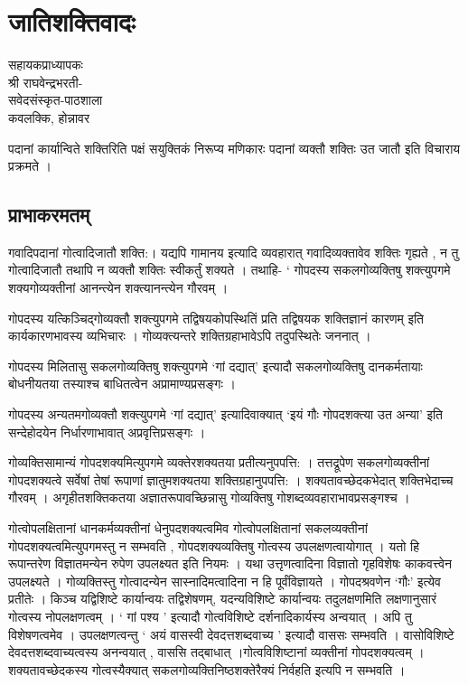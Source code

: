 {\fontsize{15}{17}\selectfont
\chapter{जातिशक्तिवादः}


\begin{center}
\smallskip

सहायकप्राध्यापकः\\
श्री राघवेन्द्रभरती-\\
सवेदसंस्कृत-पाठशाला\\
कवलक्कि, होन्नावर
\addrule
\end{center}

पदानां कार्यान्विते शक्तिरिति पक्षं सयुक्तिकं निरूप्य मणिकारः पदानां व्यक्तौ शक्तिः उत जातौ इति विचाराय प्रक्रमते ।

\section*{प्राभाकरमतम्}

गवादिपदानां गोत्वादिजातौ शक्ति:। यद्यपि गामानय इत्यादि व्यवहारात् गवादिव्यक्तावेव शक्तिः गृह्यते , न तु गोत्वादिजातौ तथापि न व्यक्तौ शक्तिः स्वीकर्तुं शक्यते । तथाहि- ‘ गोपदस्य सकलगोव्यक्तिषु शक्त्युपगमे शक्यगोव्यक्तीनां आनन्त्येन शक्त्यानन्त्येन गौरवम् ।

गोपदस्य यत्किञ्चिद्गोव्यक्तौ शक्त्युपगमे तद्विषयकोपस्थितिं प्रति तद्विषयक शक्तिज्ञानं कारणम् इति कार्यकारणभावस्य व्यभिचारः । गोव्यक्त्यन्तरे शक्तिग्रहाभावेऽपि तदुपस्थितेः जननात् ।

गोपदस्य मिलितासु सकलगोव्यक्तिषु शक्त्युपगमे ‘गां दद्यात्’ इत्यादौ सकलगोव्यक्तिषु दानकर्मतायाः बोधनीयतया तस्याश्च बाधितत्वेन अप्रामाण्यप्रसङ्गः ।

गोपदस्य अन्यतमगोव्यक्तौ शक्त्युपगमे ‘गां दद्यात्’ इत्यादिवाक्यात् ‘इयं गौः गोपदशक्त्या उत अन्या’ इति सन्देहोदयेन निर्धारणाभावात् अप्रवृत्तिप्रसङ्गः ।

गोव्यक्तिसामान्यं गोपदशक्यमित्युपगमे व्यक्तेरशक्यतया प्रतीत्यनुपपत्ति: । तत्तद्रूपेण सकलगोव्यक्तीनां गोपदशक्यत्वे सर्वेषां तेषां रूपाणां ज्ञातुमशक्यतया शक्तिग्रहानुपपत्ति: । शक्यतावच्छेदकभेदात् शक्तिभेदाच्च गौरवम् । अगृहीतशक्तिकतया अज्ञातरूपावच्छिन्नासु गोव्यक्तिषु गोशब्दव्यवहाराभावप्रसङ्गश्च ।

गोत्वोपलक्षितानां धानकर्मव्यक्तीनां धेनुपदशक्यत्वमिव गोत्वोपलक्षितानां सकलव्यक्तीनां गोपदशक्यत्वमित्युपगमस्तु न सम्भवति , गोपदशक्यव्यक्तिषु गोत्वस्य उपलक्षणत्वायोगात् । यतो हि रूपान्तरेण विज्ञातमन्येन रुपेण उपलक्ष्यत इति नियमः । यथा उत्तृणत्वादिना विज्ञातो गृहविशेषः काकवत्त्वेन उपलक्ष्यते । गोव्यक्तिस्तु गोत्वादन्येन सास्नादिमत्वादिना न हि पूर्वंविज्ञायते । गोपदश्रवणेन ‘गौः’ इत्येव प्रतीतेः । किञ्च यद्विशिष्टे कार्यान्वयः तद्विशेषणम्, यदन्यविशिष्टे कार्यान्वयः तदुलक्षणमिति लक्षणानुसारं गोत्वस्य नोपलक्षणत्वम् । ‘ गां पश्य ’ इत्यादौ गोत्वविशिष्टे दर्शनादिकार्यस्य अन्वयात् । अपि तु विशेषणत्वमेव । उपलक्षणत्वन्तु ‘ अयं वासस्वी देवदत्तशब्दवाच्य ’ इत्यादौ वाससः सम्भवति । वासोविशिष्टे देवदत्तशब्दवाच्यत्वस्य अनन्वयात् , वाससि तद्बाधात् ।गोत्वविशिष्टानां व्यक्तीनां गोपदशक्यत्वम् । शक्यतावच्छेदकस्य गोत्वस्यैक्यात् सकलगोव्यक्तिनिष्ठशक्तेरैक्यं निर्वहति इत्यपि न सम्भवति ।

}
